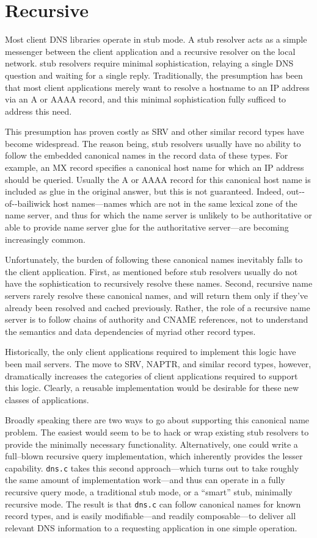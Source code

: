 \documentclass[11pt, oneside]{memoir}
\newcommand*{\dnsc}[0]{\texttt{dns.c}\xspace}
\newcommand*{\gloss}[1]{\gls{#1}\index{#1}}
\newcommand*{\Glosspl}[1]{\Glspl{#1}\index{#1}}
\begin{document}
\section{Recursive}

Most client DNS libraries operate in stub mode. A stub resolver acts as a simple messenger between the client application and a \gloss{recursive resolver} on the local network. \Glosspl{stub resolver} require minimal sophistication, relaying a single DNS question and waiting for a single reply. Traditionally, the presumption has been that most client applications merely want to resolve a hostname to an IP address via an A or AAAA record, and this minimal sophistication fully sufficed to address this need.

This presumption has proven costly as SRV and other similar record types have become widespread. The reason being, stub resolvers usually have no ability to follow the embedded canonical names in the record data of these types. For example, an MX record specifies a canonical host name for which an IP address should be queried. Usually the A or AAAA record for this canonical host name is included as \gloss{glue} in the original answer, but this is not guaranteed. Indeed, \gloss{out--of--bailiwick} host names---names which are not in the same lexical zone of the name server, and thus for which the name server is unlikely to be authoritative or able to provide name server glue for the authoritative server---are becoming increasingly common.

Unfortunately, the burden of following these canonical names inevitably falls to the client application. First, as mentioned before stub resolvers usually do not have the sophistication to recursively resolve these names. Second, recursive name servers rarely resolve these canonical names, and will return them only if they've already been resolved and cached previously. Rather, the role of a recursive name server is to follow chains of authority and CNAME references, not to understand the semantics and data dependencies of myriad other record types.

Historically, the only client applications required to implement this logic have been mail servers. The move to SRV, NAPTR, and similar record types, however, dramatically increases the categories of client applications required to support this logic. Clearly, a reusable implementation would be desirable for these new classes of applications.

Broadly speaking there are two ways to go about supporting this canonical name problem. The easiest would seem to be to hack or wrap existing stub resolvers to provide the minimally necessary functionality. Alternatively, one could write a full--blown recursive query implementation, which inherently provides the lesser capability. \dnsc takes this second approach---which turns out to take roughly the same amount of implementation work---and thus can operate in a fully recursive query mode, a traditional stub mode, or a ``smart'' stub, minimally recursive mode. The result is that \dnsc can follow canonical names for known record types, and is easily modifiable---and readily composable---to deliver all relevant DNS information to a requesting application in one simple operation.
\end{document}
